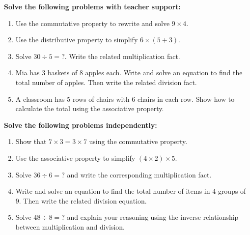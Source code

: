 \documentclass[11pt]{article}
\begin{document}
\begin{tcolorbox}[colframe=black!60, colback=white, 
coltitle=black, colbacktitle=black!15, fonttitle=\bfseries\Large, 
title=Guided Practice, halign title=center, left=10pt, right=10pt, top=10pt, bottom=15pt]
\textbf{Solve the following problems with teacher support:}
\begin{enumerate}[itemsep=5em]
    \item Use the commutative property to rewrite and solve \(9 \times 4\).
    \item Use the distributive property to simplify \(6 \times (5 + 3)\).
    \item Solve \(30 \div 5 = ?\). Write the related multiplication fact.
    \item Mia has \(3\) baskets of \(8\) apples each. Write and solve an equation to find the total number of apples. Then write the related division fact.
    \item A classroom has \(5\) rows of chairs with \(6\) chairs in each row. Show how to calculate the total using the associative property.
    \vspace{3 cm}
\end{enumerate}
\end{tcolorbox}

\vspace{1em}

\begin{tcolorbox}[colframe=black!60, colback=white, 
coltitle=black, colbacktitle=black!15, fonttitle=\bfseries\Large, 
title=Independent Practice, halign title=center, left=10pt, right=10pt, top=10pt, bottom=15pt]
\textbf{Solve the following problems independently:}
\begin{enumerate}[itemsep=5em]
    \item Show that \(7 \times 3 = 3 \times 7\) using the commutative property.
    \item Use the associative property to simplify \((4 \times 2) \times 5\).
    \item Solve \(36 \div 6 = ?\) and write the corresponding multiplication fact.
    \item Write and solve an equation to find the total number of items in \(4\) groups of \(9\). Then write the related division equation.
    \item Solve \(48 \div 8 = ?\) and explain your reasoning using the inverse relationship between multiplication and division.
\end{enumerate}
\vspace{3 cm}
\end{tcolorbox}
\end{document}
